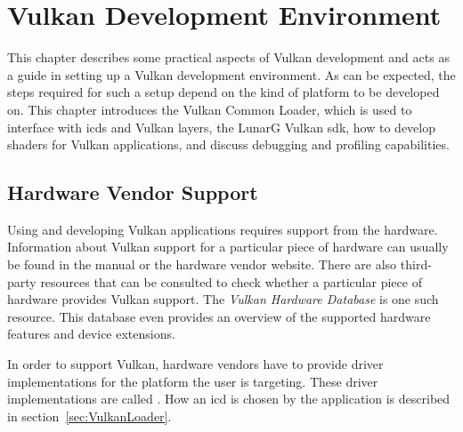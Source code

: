 
\chapter{Vulkan Development Environment}
\label{cha:EnvSetup}




  This chapter describes some practical aspects of Vulkan development and acts as a guide in setting up a Vulkan development environment. As can be expected, the steps required for such a setup depend on the kind of platform to be developed on. This chapter introduces the Vulkan Common Loader, which is used to interface with \glspl{icd} and Vulkan layers, the LunarG Vulkan \gls{sdk}, how to develop shaders for Vulkan applications, and discuss debugging and profiling capabilities.

  \section{Hardware Vendor Support}
  \label{sec:HardwareVendorSupport}
    Using and developing Vulkan applications requires support from the hardware. Information about Vulkan support for a particular piece of hardware can usually be found in the manual or the hardware vendor website. There are also third-party resources that can be consulted to check whether a particular piece of hardware provides Vulkan support. The \textit{Vulkan Hardware Database}\cite{vulkangpuinfo} is one such resource. This database even provides an overview of the supported hardware features and device extensions.

    In order to support Vulkan, hardware vendors have to provide driver implementations for the platform the user is targeting. These driver implementations are called . How an \gls{icd} is chosen by the application is described in section~\ref{sec:VulkanLoader}.

